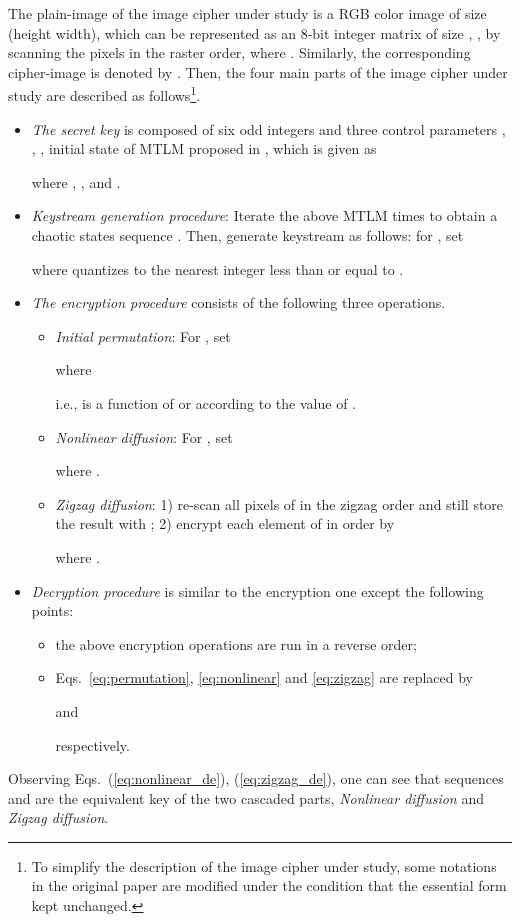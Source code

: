 \documentclass{ws-ijbc}
\begin{document}
The plain-image of the image cipher under study is a RGB color image of
size  (height  width), which can be
represented as an 8-bit integer matrix of size ,
, by
scanning the pixels in the raster order, where .
Similarly, the corresponding cipher-image is denoted by
.
Then, the four main parts of the image cipher under study are described as follows\footnote{To simplify the description of the image cipher under study,
some notations in the original paper \cite{Sam:TLM:MTA2012}
are modified under the condition that the essential form kept unchanged.}.
\begin{itemize}
\item
\textit{The secret key} is composed of six odd integers
 and three control
parameters , , , initial state 
of MTLM proposed in
\cite{Sam:TLM:MTA2012}, which is given as

where , ,  and .

\item
\textit{Keystream generation procedure}:
Iterate the above MTLM  times to obtain a chaotic states sequence
. Then, generate keystream as follows: for , set

where  quantizes  to the nearest integer less than or
equal to .

\item\textit{The encryption procedure} consists of
the following three operations.
\begin{itemize}
\item
\textit{Initial permutation}: For , set

where

i.e.,  is a function of  or  according to the value of .

\item
\textit{Nonlinear diffusion}: For , set

where .

\item \textit{Zigzag diffusion}: 1) re-scan all pixels of  in the zigzag order and still store the result with ;
    2) encrypt each element of  in order by

where .
\end{itemize}

\item \textit{Decryption procedure} is similar to the encryption one except the following points:
\begin{itemize}
\item the above encryption operations are run in a reverse order;
\item Eqs.~\eqref{eq:permutation}, \eqref{eq:nonlinear} and \eqref{eq:zigzag} are replaced by


and

respectively.
\end{itemize}
\end{itemize}
Observing Eqs.~(\ref{eq:nonlinear_de}), (\ref{eq:zigzag_de}), one can see
that sequences  and  are the equivalent key of the two cascaded parts, \textit{Nonlinear diffusion} and
\textit{Zigzag diffusion}.
\end{document}
